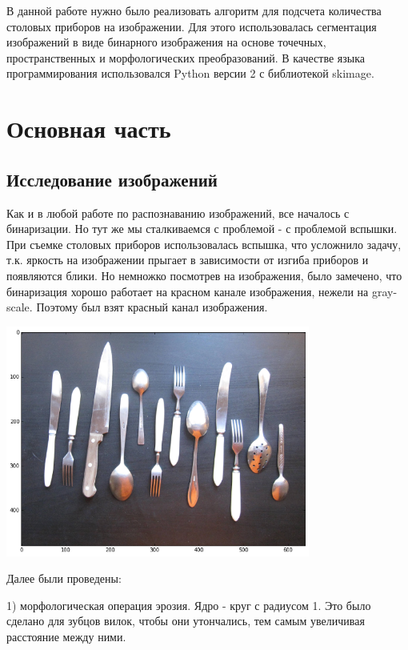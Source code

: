 \documentclass[12pt, a4paper]{article}
\begin{document}
        В данной работе нужно было реализовать алгоритм для подсчета количества столовых приборов на изображении. Для этого использовалась сегментация изображений в виде бинарного изображения на основе точечных, пространственных и морфологических преобразований. В качестве языка программирования использовался Python версии 2 с библиотекой skimage.

    \newpage
    \section{Основная часть}
        \subsection{Исследование изображений}

            Как и в любой работе по распознаванию изображений, все началось с бинаризации. Но тут же мы сталкиваемся с проблемой - с проблемой вспышки. При съемке столовых приборов использовалась вспышка, что усложнило задачу, т.к. яркость на изображении прыгает в зависимости от изгиба приборов и появляются блики. Но немножко посмотрев на изображения, было замечено, что бинаризация хорошо работает на красном канале изображения, нежели на gray-scale. Поэтому был взят красный канал изображения.

            \begin{center}
                \includegraphics[width=10cm]{0.png}
            \end{center}

            Далее были проведены:

            1) морфологическая операция эрозия. Ядро - круг с радиусом 1. Это было сделано для зубцов вилок, чтобы они утончались, тем самым увеличивая расстояние между ними.
\end{document}
